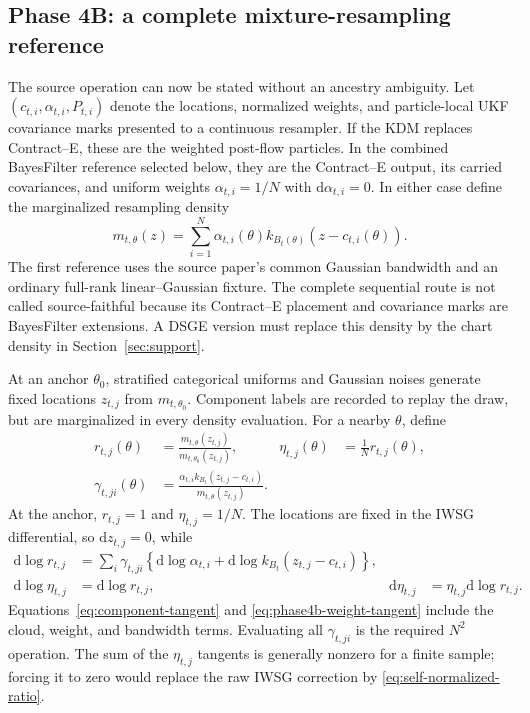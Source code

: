 \documentclass[11pt]{article}
\newcommand{\dd}{\mathrm{d}}
\begin{document}
\subsection{Phase 4B: a complete mixture-resampling reference}

The source operation can now be stated without an ancestry ambiguity.  Let
$(c_{t,i},\alpha_{t,i},P_{t,i})$ denote the locations, normalized weights, and
particle-local UKF covariance marks presented to a continuous resampler.  If
the KDM replaces Contract--E, these are the weighted post-flow particles.  In
the combined BayesFilter reference selected below, they are the Contract--E
output, its carried covariances, and uniform weights
$\alpha_{t,i}=1/N$ with $\dd\alpha_{t,i}=0$.  In either case define the
marginalized resampling density
\begin{equation}
 m_{t,\theta}(z)=\sum_{i=1}^N
   \alpha_{t,i}(\theta)k_{B_t(\theta)}
      (z-c_{t,i}(\theta)).
 \label{eq:phase4b-mixture}
\end{equation}
The first reference uses the source paper's common Gaussian bandwidth and an
ordinary full-rank linear--Gaussian fixture.  The complete sequential route is
not called source-faithful because its Contract--E placement and covariance
marks are BayesFilter extensions.  A DSGE version must replace this density by
the chart density in Section~\ref{sec:support}.

At an anchor $\theta_0$, stratified categorical uniforms and Gaussian noises
generate fixed locations $z_{t,j}$ from $m_{t,\theta_0}$.  Component labels are
recorded to replay the draw, but are marginalized in every density evaluation.
For a nearby $\theta$, define
\begin{align}
 r_{t,j}(\theta)
   &=\frac{m_{t,\theta}(z_{t,j})}
           {m_{t,\theta_0}(z_{t,j})}, &
 \eta_{t,j}(\theta)
   &=\frac{1}{N}r_{t,j}(\theta),
 \label{eq:phase4b-iwsg-weights}\\
 \gamma_{t,ji}(\theta)
   &=\frac{\alpha_{t,i}k_{B_t}(z_{t,j}-c_{t,i})}
           {m_{t,\theta}(z_{t,j})}. &&
 \label{eq:phase4b-responsibilities}
\end{align}
At the anchor, $r_{t,j}=1$ and $\eta_{t,j}=1/N$.  The locations are fixed in the IWSG
differential, so $\dd z_{t,j}=0$, while
\begin{align}
 \dd\log r_{t,j}
   &=\sum_i\gamma_{t,ji}
      \left\{\dd\log\alpha_{t,i}
             +\dd\log k_{B_t}(z_{t,j}-c_{t,i})\right\},\\
 \dd\log\eta_{t,j}&=\dd\log r_{t,j}, &
 \dd\eta_{t,j}&=\eta_{t,j}\dd\log r_{t,j}.
 \label{eq:phase4b-weight-tangent}
\end{align}
Equations~\eqref{eq:component-tangent} and
\eqref{eq:phase4b-weight-tangent} include the cloud, weight, and bandwidth
terms.  Evaluating all $\gamma_{t,ji}$ is the required $N^2$ operation.  The
sum of the $\eta_{t,j}$ tangents is generally nonzero for a finite sample;
forcing it to zero would replace the raw IWSG correction by
\eqref{eq:self-normalized-ratio}.
\end{document}

